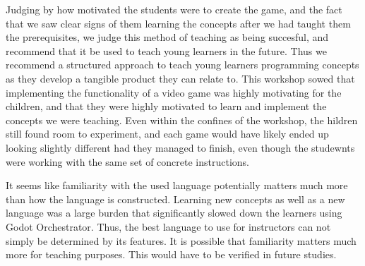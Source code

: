 Judging by how
motivated the students were to create the game, and the fact that
we saw clear signs of them learning the concepts after we had
taught them the prerequisites, we judge this method of teaching as
being succesful, and recommend that it be used to teach young
learners in the future.
Thus we recommend a structured approach to
teach young learners programming concepts as they develop a tangible
product they can relate to.
This workshop sowed that implementing the
functionality of a video game was highly motivating for the children,
and that they were highly motivated to learn and implement the
concepts we were teaching.
Even within the confines of the workshop,
the hildren still found room to experiment, and each game would have
likely ended up looking slightly different had they managed to
finish, even though the studewnts were working with the same set of
concrete instructions.

It seems like familiarity with the used language potentially matters much more than
how the language is constructed.
Learning new concepts as well as a
new language was a large burden that significantly slowed down the
learners using Godot Orchestrator.
Thus, the best language to use for
instructors can not simply be determined by its features.
It is possible that familiarity matters much more for teaching purposes.
This would have to be verified in future studies.